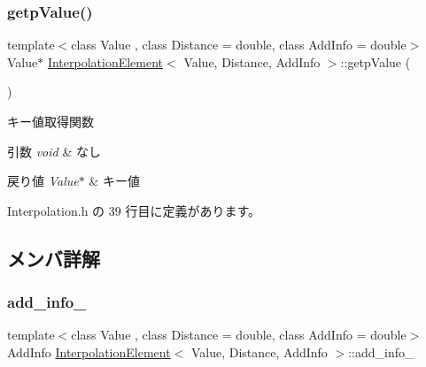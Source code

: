 \subsubsection{\texorpdfstring{getp\+Value()}{getpValue()}}
{\footnotesize\ttfamily template$<$class Value , class Distance  = double, class Add\+Info  = double$>$ \\
Value$\ast$ \mbox{\hyperlink{class_interpolation_element}{Interpolation\+Element}}$<$ Value, Distance, Add\+Info $>$\+::getp\+Value (\begin{DoxyParamCaption}{ }\end{DoxyParamCaption})\hspace{0.3cm}{\ttfamily [inline]}}



キー値取得関数 


\begin{DoxyParams}{引数}
{\em void} & なし \\
\hline
\end{DoxyParams}

\begin{DoxyRetVals}{戻り値}
{\em Value$\ast$} & キー値 \\
\hline
\end{DoxyRetVals}


 Interpolation.\+h の 39 行目に定義があります。



\subsection{メンバ詳解}
\mbox{\label{class_interpolation_element_ad167e0db48484051ee336f45e010b536}} 
\subsubsection{\texorpdfstring{add\+\_\+info\+\_\+}{add\_info\_}}
{\footnotesize\ttfamily template$<$class Value , class Distance  = double, class Add\+Info  = double$>$ \\
Add\+Info \mbox{\hyperlink{class_interpolation_element}{Interpolation\+Element}}$<$ Value, Distance, Add\+Info $>$\+::add\+\_\+info\+\_\+\hspace{0.3cm}{\ttfamily [private]}}



